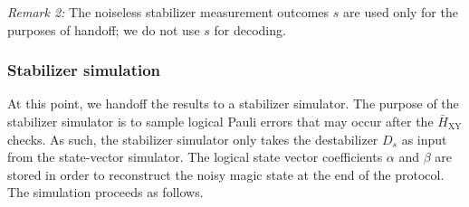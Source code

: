 \documentclass[%
    aps, 
    physrev,
    reprint,
]{revtex4-2}
\newcommand{\XY}{_\mathrm{XY}}
\begin{document}
\textit{Remark 2:} 
The noiseless stabilizer measurement outcomes $s$ are used only for the purposes of handoff; 
we do not use $s$ for decoding.
        
\subsubsection{Stabilizer simulation}

At this point, we handoff the results to a stabilizer simulator.
The purpose of the stabilizer simulator is to sample logical Pauli errors that may occur after the $\bar{H}\XY$ checks.
As such, the stabilizer simulator only takes the destabilizer $D_s$ as input from the state-vector simulator.
The logical state vector coefficients $\alpha$ and $\beta$ are stored in order to reconstruct the noisy magic state at the end of the protocol.
The simulation proceeds as follows.
\end{document}
